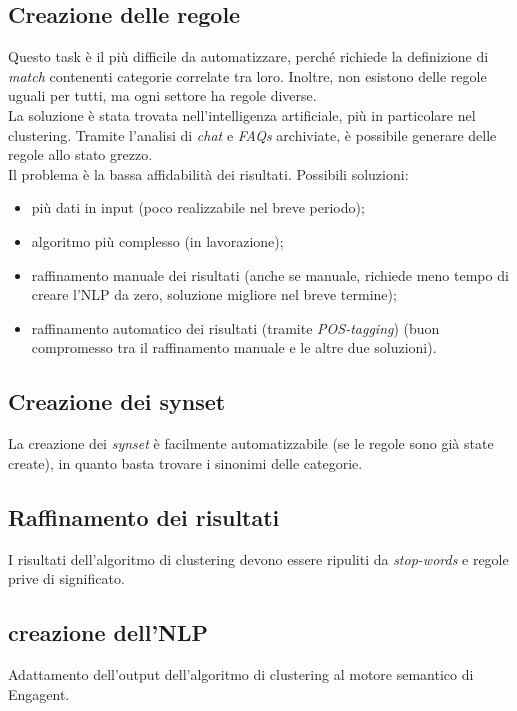 \subsection{Creazione delle regole}\label{creazione_regole}
Questo task è il più difficile da automatizzare, perché richiede la definizione di \emph{match} contenenti categorie correlate tra loro. Inoltre, non esistono delle regole uguali per tutti, ma ogni settore ha regole diverse.\\
La soluzione è stata trovata nell'intelligenza artificiale, più in particolare nel clustering. Tramite l'analisi di \emph{chat} e \textit{FAQs} archiviate, è possibile generare delle regole allo stato grezzo.\\
Il problema è la bassa affidabilità dei risultati. Possibili soluzioni:
\begin{itemize}
    \item più dati in input (poco realizzabile nel breve periodo);
    \item algoritmo più complesso (in lavorazione);
    \item raffinamento manuale dei risultati (anche se manuale, richiede meno tempo di creare l'NLP da zero, soluzione migliore nel breve termine); 
    \item raffinamento automatico dei risultati (tramite \emph{POS-tagging}) (buon compromesso tra il raffinamento manuale e le altre due soluzioni).
\end{itemize}

\subsection{Creazione dei synset}
La creazione dei \emph{synset} è facilmente automatizzabile (se le regole sono già state create), in quanto basta trovare i sinonimi delle categorie.

\subsection{Raffinamento dei risultati}
I risultati dell'algoritmo di clustering devono essere ripuliti da \emph{stop-words} e regole prive di significato.

\subsection{creazione dell'NLP}
Adattamento dell'output dell'algoritmo di clustering al motore semantico di Engagent.

